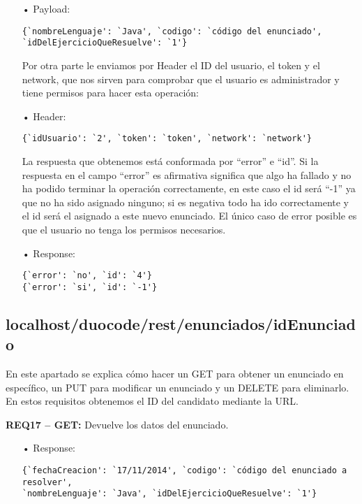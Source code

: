 \begin{itemize}
\item[•]
Payload: 
{\codesize
\begin{verbatim}
{`nombreLenguaje': `Java', `codigo': `código del enunciado', 
`idDelEjercicioQueResuelve': `1'}
\end{verbatim}
}

Por otra parte le enviamos por Header el ID del usuario, el token y el network, que nos sirven para comprobar que el usuario es administrador y tiene permisos para hacer esta operación:

\item[•]
Header:
{\codesize
\begin{verbatim} 
{`idUsuario': `2', `token': `token', `network': `network'}
\end{verbatim}
}

La respuesta que obtenemos está conformada por ``error'' e ``id''. Si la respuesta en el campo ``error'' es afirmativa significa que algo ha fallado y no ha podido terminar la operación correctamente, en este caso el id será ``-1'' ya que no ha sido asignado ninguno; si es negativa todo ha ido correctamente y el id será el asignado a este nuevo enunciado. El único caso de error posible es que el usuario no tenga los permisos necesarios.

\item[•]
Response: 
{\codesize
\begin{verbatim}
{`error': `no', `id': `4'} 
{`error': `si', `id': `-1'} 
\end{verbatim}
}
\end{itemize}

\subsection{localhost/duocode/rest/enunciados/idEnunciado}
En este apartado se explica cómo hacer un GET para obtener un enunciado en específico, un PUT para modificar un enunciado y un DELETE para eliminarlo.
En estos requisitos obtenemos el ID del candidato mediante la URL.
\vspace{1em}


\textbf{REQ17 – GET:} Devuelve los datos del enunciado.

\begin{itemize}
\item[•]
Response: 
{\codesize
\begin{verbatim}
{`fechaCreacion': `17/11/2014', `codigo': `código del enunciado a resolver', 
`nombreLenguaje': `Java', `idDelEjercicioQueResuelve': `1'}
\end{verbatim}
}
\end{itemize}

